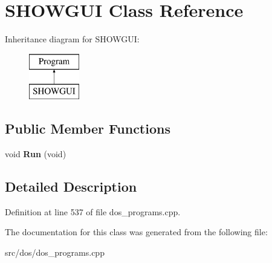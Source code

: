 \hypertarget{classSHOWGUI}{\section{S\-H\-O\-W\-G\-U\-I Class Reference}
\label{classSHOWGUI}
}
Inheritance diagram for S\-H\-O\-W\-G\-U\-I\-:\begin{figure}[H]
\begin{center}
\leavevmode
\includegraphics[height=2.000000cm]{classSHOWGUI}
\end{center}
\end{figure}
\subsection*{Public Member Functions}
\begin{DoxyCompactItemize}
\item 
\hypertarget{classSHOWGUI_a6aa41914fca5264f9c63856c9578dd29}{void {\bfseries Run} (void)}\label{classSHOWGUI_a6aa41914fca5264f9c63856c9578dd29}

\end{DoxyCompactItemize}


\subsection{Detailed Description}


Definition at line 537 of file dos\-\_\-programs.\-cpp.



The documentation for this class was generated from the following file\-:\begin{DoxyCompactItemize}
\item 
src/dos/dos\-\_\-programs.\-cpp\end{DoxyCompactItemize}
